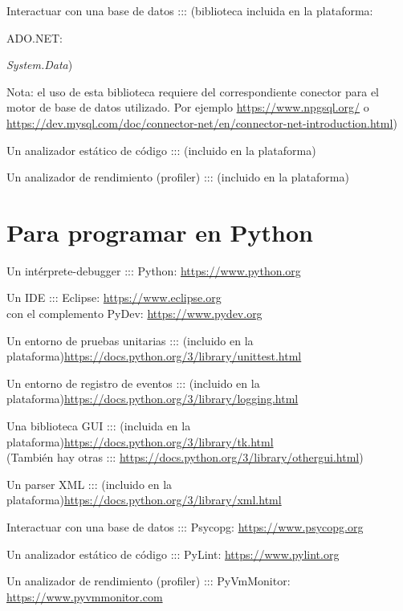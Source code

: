\documentclass[spanish,12pt,a4paper,final,oneside]{book}
\begin{document}
Interactuar con una base de datos ::: (biblioteca incluida en la plataforma: \begin{footnotesize}ADO.NET:\end{footnotesize} \textit{ System.Data}) \begin{footnotesize}Nota: el uso de esta biblioteca requiere del correspondiente conector para el motor de base de datos utilizado. Por ejemplo \url{https://www.npgsql.org/} o \url{https://dev.mysql.com/doc/connector-net/en/connector-net-introduction.html})\end{footnotesize} 

Un analizador estático de código :::   (incluido en la plataforma)

Un analizador de rendimiento (profiler) :::   (incluido en la plataforma)


\section{Para programar en Python}

Un intérprete-debugger ::: Python: \url{https://www.python.org} 

Un IDE ::: Eclipse: \url{https://www.eclipse.org} 
\\con el complemento PyDev: \url{https://www.pydev.org} 

Un entorno de pruebas unitarias ::: (incluido en la plataforma)\url{https://docs.python.org/3/library/unittest.html}

Un entorno de registro de eventos ::: (incluido en la plataforma)\url{https://docs.python.org/3/library/logging.html}

Una biblioteca GUI ::: (incluida en la plataforma)\url{https://docs.python.org/3/library/tk.html}
\\(También hay otras ::: \url{https://docs.python.org/3/library/othergui.html})

Un parser XML ::: (incluido en la plataforma)\url{https://docs.python.org/3/library/xml.html}

Interactuar con una base de datos ::: Psycopg: \url{https://www.psycopg.org} 

Un analizador estático de código ::: PyLint: \url{https://www.pylint.org} 

Un analizador de rendimiento (profiler) ::: PyVmMonitor: \url{https://www.pyvmmonitor.com} 
\end{document}
